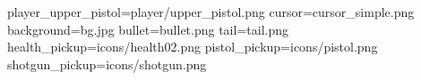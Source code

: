 player_upper_pistol=player/upper_pistol.png
cursor=cursor_simple.png
background=bg.jpg
bullet=bullet.png
tail=tail.png
health_pickup=icons/health02.png
pistol_pickup=icons/pistol.png
shotgun_pickup=icons/shotgun.png
